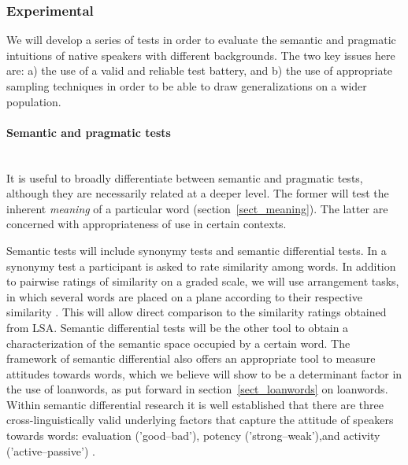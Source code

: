 \documentclass[a4paper]{article}
\begin{document}
\subsubsection{Experimental}
\label{subsect_experim}

We will develop a series of tests in order to evaluate the semantic and pragmatic intuitions of native speakers with different backgrounds.
The two key issues here are: a) the use of a valid and reliable test battery, and b) the use of appropriate sampling techniques in order to be able to draw generalizations on a wider population.

\paragraph{ Semantic and pragmatic tests}
\hspace{0pt} \\
It is useful to broadly differentiate between semantic and pragmatic tests, although they are necessarily related at a deeper level.
The former will test the inherent \emph{meaning} of a particular word (section~\ref{sect_meaning}). 
The latter are concerned with appropriateness of use in certain contexts.

Semantic tests will include synonymy tests and semantic differential tests.
In a synonymy test a participant is asked to rate similarity among words.
In addition to pairwise ratings of similarity on a graded scale, we will use arrangement tasks, in which several words are placed on a plane according to their respective similarity \citep{Goldstone1994, Kriegeskorte2012}.
This will allow direct comparison to the similarity ratings obtained from LSA.
Semantic differential tests \citep{Osgood1957} will be the other tool to obtain a characterization of the semantic space occupied by a certain word.
The framework of semantic differential also offers an appropriate tool to measure attitudes towards words, which we believe will show to be a determinant factor in the use of loanwords, as put forward in section~\ref{sect_loanwords} on loanwords.
Within semantic differential research it is well established that there are three cross-linguistically valid underlying factors that capture the attitude of speakers towards words: evaluation ('good--bad'), potency ('strong--weak'),and activity ('active--passive') \citep[see][]{Heise2010}.
\end{document}
